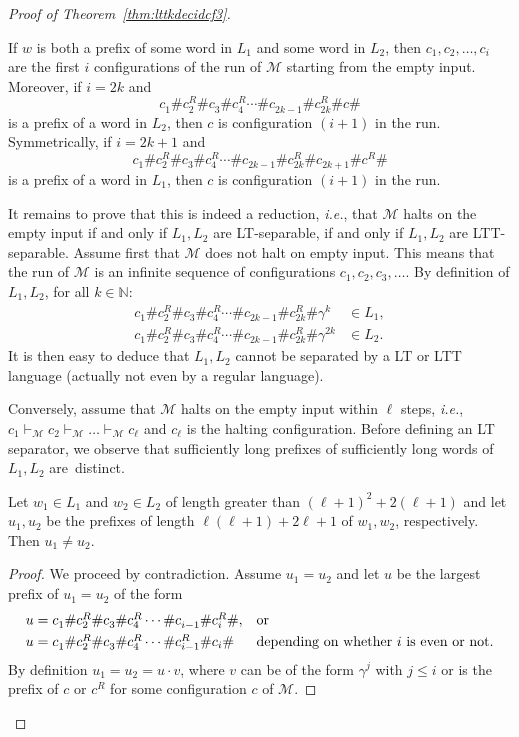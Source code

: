 \documentclass{LMCS}
\newcommand\nat{\ensuremath{\mathbb{N}}\xspace}
\newcommand{\lt}{\textup{LT}\xspace}
\newcommand{\ltt}{\textup{LTT}\xspace}
\let\leq\leqslant
\theoremstyle{plain}
\begin{document}
\begin{proof}[Proof of Theorem~\ref{thm:lttkdecidcf3}]
   \begin{fact} \label{fct:reduc} If $w$ is both a prefix of some word
    in $L_1$ and some word in $L_2$, then $c_1,c_2,\ldots,c_{i}$ are
    the first $i$ configurations of the run of $\mathcal{M}$ starting from the
    empty input. Moreover, if $i=2k$ and
    \[
    c^{}_1\#c_2^{R}\#c^{}_3\#c_4^R \cdots \#c^{}_{2k-1}\#c_{2k}^R\#c\#
    \]
  is a prefix of a word in $L_2$, then $c$ is configuration $(i+1)$ in
  the run. Symmetrically, if $i=2k+1$ and
  \[
  c^{}_1\#c_2^{R}\#c^{}_3\#c_4^R \cdots \#c^{}_{2k-1}\#c_{2k}^{R}\#c^{}_{2k+1}\#c^{R}\#
  \]
  is a prefix of a word in $L_1$, then $c$ is configuration $(i+1)$ in
  the run.
\end{fact}

It remains to prove that this is indeed a reduction, \emph{i.e.}, that
$\mathcal{M}$ halts on the empty input if and only if $L_1,L_2$ are \lt-separable, if
and only if $L_1,L_2$ are \ltt-separable.
Assume first that $\mathcal{M}$ does not halt on empty input. This means that
the run of $\mathcal{M}$ is an infinite sequence of configurations
$c_1,c_2,c_3,\dots$. By definition of $L_1,L_2$, for all $k \in \nat$:
\[
\begin{array}{ll}
  c^{}_1\#c_2^{R}\#c^{}_3\#c_4^R \cdots \#c^{}_{2k-1}\#c_{2k}^R \# \gamma^k &\in L_1, \\[.8ex]
  c^{}_1\#c_2^{R}\#c^{}_3\#c_4^R \cdots \#c^{}_{2k-1}\#c_{2k}^R \# \gamma^{2k} &\in L_2.
\end{array}
\]
It is then easy to deduce that $L_1,L_2$ cannot be separated by a \lt
or \ltt language (actually not even by a regular language).

\smallskip

Conversely, assume that $\mathcal{M}$ halts on the empty input within $\ell$
 steps, \emph{i.e.},
$c_1\vdash_{\mathcal{M}}c_2\vdash_{\mathcal{M}}\ldots\vdash_{\mathcal{M}}c_\ell$
and $c_\ell$ is the halting configuration. Before defining an \lt
separator, we observe that sufficiently long prefixes of sufficiently long words of $L_1,L_2$
are~distinct.

\begin{lem} \label{lem:reduc} Let $w_1 \in L_1$ and $w_2\in L_2$ of length
  greater than $(\ell+1)^2+2(\ell+1)$ and let $u_1,u_2$ be the prefixes of length
  $\ell(\ell+1)+2\ell+1$ of $w_1,w_2$, respectively. Then $u_1 \neq u_2$.
\end{lem}

\begin{proof}
  We proceed by contradiction. Assume $u_1 = u_2$ and let $u$ be the
  largest prefix of $u_1=u_2$ of the form
  \[
  \begin{array}{l@{\;}ll}
    u=&c^{}_1 \# c_2^{R} \# c^{}_3 \# c_4^R \cdots \# c^{}_{i-1} \#
    c_{i}^R \#,&\text{or} \\[.8ex]
    u=&c^{}_1 \# c_2^{R} \# c^{}_3 \# c_4^R \cdots \# c_{i-1}^{R} \#
    c_{i} \#&\text{depending on whether $i$ is even or not.}
  \end{array}
  \]
  By definition $u_1=u_2=u \cdot v$, where $v$ can be of the form
  $\gamma^{j}$ with $j \leq i$ or is the prefix of $c$ or $c^R$ for
  some configuration $c$ of $\mathcal{M}$.


\end{proof}
\end{proof}
\end{document}
